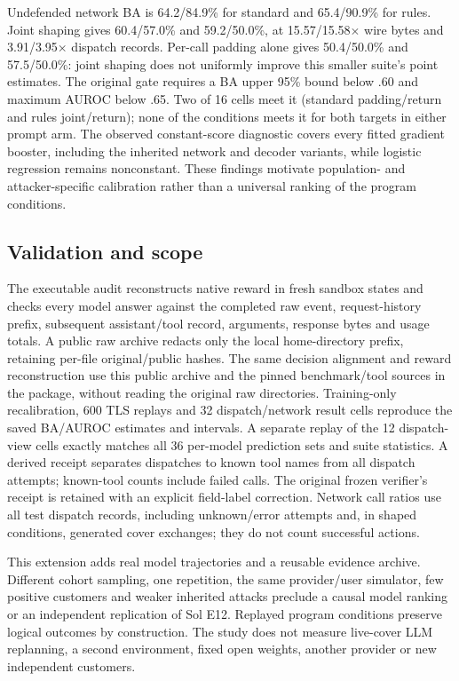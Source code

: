 Undefended network BA is 64.2/84.9\% for standard and 65.4/90.9\% for rules. Joint shaping gives 60.4/57.0\% and 59.2/50.0\%, at 15.57/15.58$\times$ wire bytes and 3.91/3.95$\times$ dispatch records. Per-call padding alone gives 50.4/50.0\% and 57.5/50.0\%: joint shaping does not uniformly improve this smaller suite's point estimates. The original gate requires a BA upper 95\% bound below .60 and maximum AUROC below .65. Two of 16 cells meet it (standard padding/return and rules joint/return); none of the conditions meets it for both targets in either prompt arm. The observed constant-score diagnostic covers every fitted gradient booster, including the inherited network and decoder variants, while logistic regression remains nonconstant. These findings motivate population- and attacker-specific calibration rather than a universal ranking of the program conditions.

\subsection{Validation and scope}
The executable audit reconstructs native reward in fresh sandbox states and checks every model answer against the completed raw event, request-history prefix, subsequent assistant/tool record, arguments, response bytes and usage totals. A public raw archive redacts only the local home-directory prefix, retaining per-file original/public hashes. The same decision alignment and reward reconstruction use this public archive and the pinned benchmark/tool sources in the package, without reading the original raw directories. Training-only recalibration, 600 TLS replays and 32 dispatch/network result cells reproduce the saved BA/AUROC estimates and intervals. A separate replay of the 12 dispatch-view cells exactly matches all 36 per-model prediction sets and suite statistics. A derived receipt separates dispatches to known tool names from all dispatch attempts; known-tool counts include failed calls. The original frozen verifier's receipt is retained with an explicit field-label correction. Network call ratios use all test dispatch records, including unknown/error attempts and, in shaped conditions, generated cover exchanges; they do not count successful actions.

This extension adds real model trajectories and a reusable evidence archive. Different cohort sampling, one repetition, the same provider/user simulator, few positive customers and weaker inherited attacks preclude a causal model ranking or an independent replication of Sol E12. Replayed program conditions preserve logical outcomes by construction. The study does not measure live-cover LLM replanning, a second environment, fixed open weights, another provider or new independent customers.

